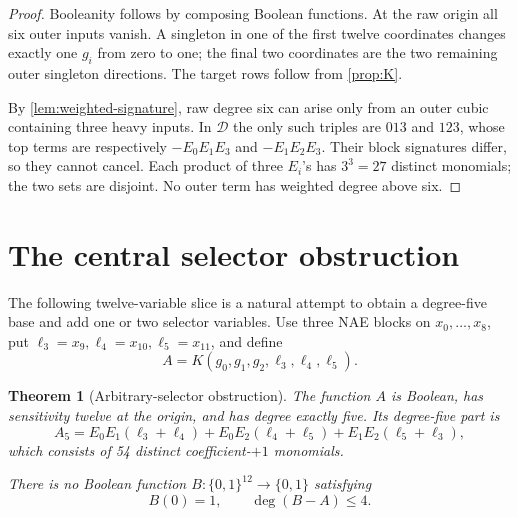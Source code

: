 \documentclass[11pt]{article}
\newtheorem{theorem}{Theorem}[section]
\theoremstyle{definition}
\newcommand{\cube}[1]{\{0,1\}^{#1}}
\begin{document}
\begin{proof}
Booleanity follows by composing Boolean functions.  At the raw origin all six
outer inputs vanish.  A singleton in one of the first twelve coordinates
changes exactly one \(g_i\) from zero to one; the final two coordinates are
the two remaining outer singleton directions.  The target rows follow from
\cref{prop:K}.

By \cref{lem:weighted-signature}, raw degree six can arise only from an outer
cubic containing three heavy inputs.  In \(\mathcal D\) the only such triples
are \(013\) and \(123\), whose top terms are respectively
\(-E_0E_1E_3\) and \(-E_1E_2E_3\).  Their block signatures differ, so they
cannot cancel.  Each product of three \(E_i\)'s has \(3^3=27\) distinct
monomials; the two sets are disjoint.  No outer term has weighted degree above
six.
\end{proof}

\section{The central selector obstruction}\label{sec:selector}

The following twelve-variable slice is a natural attempt to obtain a
degree-five base and add one or two selector variables.  Use three NAE blocks
on \(x_0,\ldots,x_8\), put
\(\ell_3=x_9,\ell_4=x_{10},\ell_5=x_{11}\), and define
\[
 A=K(g_0,g_1,g_2,\ell_3,\ell_4,\ell_5).
\]

\begin{theorem}[Arbitrary-selector obstruction]\label{thm:selector}
The function \(A\) is Boolean, has sensitivity twelve at the origin, and has
degree exactly five.  Its degree-five part is
\[
 A_5=E_0E_1(\ell_3+\ell_4)
     +E_0E_2(\ell_4+\ell_5)
     +E_1E_2(\ell_5+\ell_3),
\]
which consists of 54 distinct coefficient-\(+1\) monomials.

There is no Boolean function \(B:\cube{12}\to\{0,1\}\) satisfying
\[
 B(0)=1,
 \qquad \deg(B-A)\le4.
\]
\end{theorem}
\end{document}
